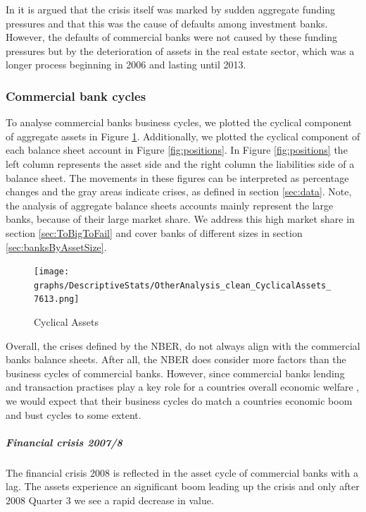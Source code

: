 \documentclass[12pt, a4paper]{article} %
\begin{document}
In \citet{antoniades2019commercial} it is argued that the crisis itself was marked by sudden aggregate funding pressures and that this was the cause of defaults among investment banks. However, the defaults of commercial banks were not caused by these funding pressures but by the deterioration of assets in the real estate sector, which was a longer process beginning in 2006 and lasting until 2013.
\fi




\subsubsection{Commercial bank cycles}

To analyse commercial banks business cycles, we plotted the cyclical component of aggregate assets in Figure \ref{fig:cyclial_assets}. Additionally, we plotted the cyclical component of each balance sheet account in Figure \ref{fig:positions}. In Figure \ref{fig:positions} the left column represents the asset side and the right column the liabilities side of a balance sheet. The movements in these figures can be interpreted as percentage changes and the gray areas indicate crises, as defined in section \ref{sec:data}. Note, the analysis of aggregate balance sheets accounts mainly represent the large banks, because of their large market share. We address this high market share in section \ref{sec:ToBigToFail} and cover banks of different sizes in section \ref{sec:banksByAssetSize}.

\begin{figure}[H]
\begin{minipage}{\textwidth}
\texttt{[image: graphs/DescriptiveStats/OtherAnalysis\_clean\_CyclicalAssets\_7613.png]}
\caption[1]{Cyclical Assets}
\label{fig:cyclial_assets}
\end{minipage}
\end{figure}

Overall, the crises defined by the NBER, do not always align with the commercial banks balance sheets. After all, the NBER does consider more factors than the business cycles of commercial banks. However, since commercial banks lending and transaction practises play a key role for a countries overall economic welfare , we would expect that their business cycles do match a countries economic boom and bust cycles to some extent.


\subparagraph{Financial crisis 2007/8}
The financial crisis 2008 is reflected in the asset cycle of commercial banks with a lag. The assets experience an significant boom leading up the crisis and only after $2008$ Quarter 3 we see a rapid decrease in value.
\end{document}

